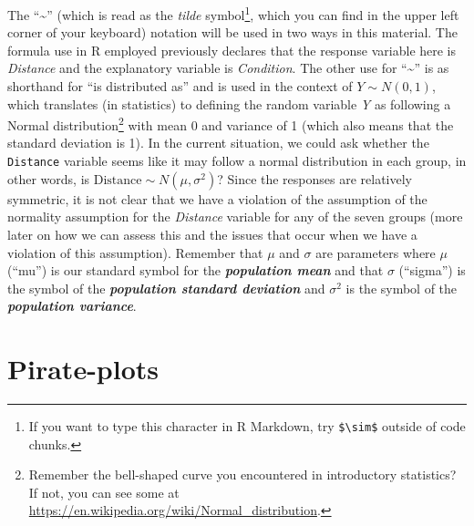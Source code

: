\documentclass[
]{book}
\begin{document}
\indent The ``\textasciitilde{}'' (which is read as the \emph{tilde} symbol\footnote{If you want to type this character in R Markdown, try \texttt{\$\textbackslash{}sim\$} outside of code chunks.}, which you can find in the
upper left corner of your keyboard) notation will be used in two ways in this
material.  The formula use in R employed previously declares that the
response variable here is \emph{Distance} and the explanatory variable is \emph{Condition}.
The other use for ``\textasciitilde{}'' is as shorthand for ``is distributed as'' and is used in
the context of \(Y \sim N(0,1)\), which translates (in statistics) to defining the
random variable \emph{Y} as following a Normal distribution\footnote{Remember the
  bell-shaped curve you encountered in introductory statistics? If not, you can
  see some at \url{https://en.wikipedia.org/wiki/Normal_distribution}.}
with mean 0
and variance of 1 (which also means that the standard deviation is 1). In the current situation, we could ask whether
the \texttt{Distance} variable seems like it may follow a normal distribution in each group, in
other words, is \(\text{Distance}\sim N(\mu,\sigma^2)\)? Since the responses are relatively symmetric, it is not clear that we have a violation of the assumption of the normality assumption for the \emph{Distance} variable for any of the seven groups (more later on how we can assess this and the issues that occur when we have a violation of this assumption). Remember that
\(\mu\) and \(\sigma\) are parameters where
\(\mu\) (``mu'') is our standard symbol for the \textbf{\emph{population mean}}
and that \(\sigma\) (``sigma'') is the symbol of the
\textbf{\emph{population standard deviation}} and \(\sigma^2\) is the symbol of the
\textbf{\emph{population variance}}.  

\hypertarget{section2-2}{%
\section{Pirate-plots}\label{section2-2}}
\end{document}
